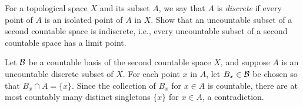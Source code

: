 \begin{prob}
    For a topological space $X$ and its subset $A$, we say that $A$ is \textit{discrete} if every point of $A$ is an isolated point of $A$ in $X$.
    Show that an uncountable subset of a second countable space is indiscrete, i.e., every uncountable subset of a second countable space has a limit point.
\end{prob}
\begin{sol}
    Let ${\mathcal{B}}$ be a countable basis of the second countable space $X$, and suppose $A$ is an uncountable discrete subset of $X$.
    For each point $x$ in $A$, let $B_x\in{\mathcal{B}}$ be chosen so that $B_x\cap A=\{x\}$.
    Since the collection of $B_x$ for $x\in A$ is countable, there are at most countably many distinct singletons $\{x\}$ for $x\in A$, a contradiction.
\end{sol}
